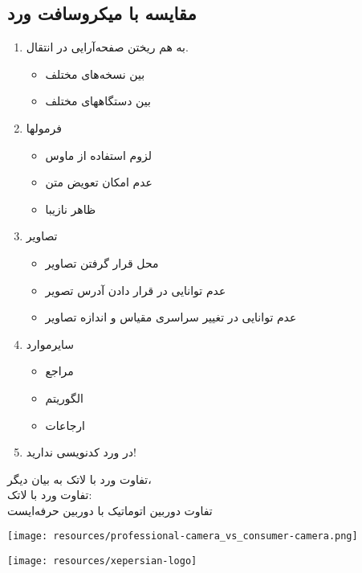 \subsection{مقایسه با میکروسافت ورد }
\begin{plainslide}%
\begin{enumerate}
  \item\alert{به هم ریختن صفحه‌آرایی در انتقال.}
    \begin{itemize}
    \item  بین نسخه‌های مختلف
    \item بین دستگاههای مختلف
    \end{itemize}
  \item\alert{فرمولها}
    \begin{itemize}
    \item لزوم استفاده از ماوس
    \item عدم امکان تعویض متن
    \item ظاهر نازیبا
    \end{itemize}
\end{enumerate}
\end{plainslide}
\begin{plainslide}
\begin{enumerate}
\setcounter{enumi}{2}
\item\alert{تصاویر}
    \begin{itemize}
    \item محل قرار گرفتن تصاویر
    \item عدم توانایی در قرار دادن آدرس تصویر
    \item عدم توانایی در تغییر سراسری مقیاس و اندازه تصاویر
    \end{itemize}
\item\alert{سایرموارد}
    \begin{itemize}
    \item مراجع
    \item الگوریتم
    \item ارجاعات
    \end{itemize}
\item\alert{\Large در ورد کدنویسی ندارید!}
\end{enumerate}
\end{plainslide}
%
\begin{plainslide}
\begin{block}{تفاوت ورد با لاتک}
\Large
به بیان دیگر،\\
تفاوت ورد با لاتک:\\
تفاوت دوربین اتوماتیک با دوربین حرفه‌ایست
\end{block}
\begin{center}
\texttt{[image: resources/professional-camera\_vs\_consumer-camera.png]}
\end{center}
\end{plainslide}
%
\label{Sec:Xepersian}
\begin{plainslide}[زی‌پرشین]
\centering
\texttt{[image: resources/xepersian-logo]}\\
\end{plainslide}

